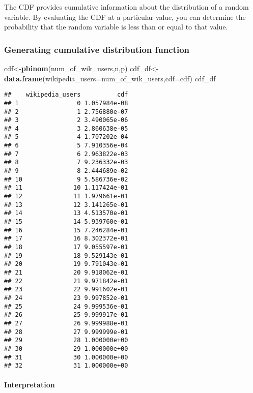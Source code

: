 \documentclass[
]{article}
\newenvironment{Shaded}{\begin{snugshade}}{\end{snugshade}}
\newcommand{\AttributeTok}[1]{\textcolor[rgb]{0.13,0.29,0.53}{#1}}
\newcommand{\FunctionTok}[1]{\textcolor[rgb]{0.13,0.29,0.53}{\textbf{#1}}}
\newcommand{\NormalTok}[1]{#1}
\newcommand{\OtherTok}[1]{\textcolor[rgb]{0.56,0.35,0.01}{#1}}
\begin{document}
The CDF provides cumulative information about the distribution of a
random variable. By evaluating the CDF at a particular value, you can
determine the probability that the random variable is less than or equal
to that value.

\subsubsection{Generating cumulative distribution
function}\label{generating-cumulative-distribution-function}

\begin{Shaded}
\begin{Highlighting}[]
\NormalTok{cdf}\OtherTok{\textless{}{-}}\FunctionTok{pbinom}\NormalTok{(num\_of\_wik\_users,n,p)}
\NormalTok{cdf\_df}\OtherTok{\textless{}{-}}\FunctionTok{data.frame}\NormalTok{(}\AttributeTok{wikipedia\_users=}\NormalTok{num\_of\_wik\_users,}\AttributeTok{cdf=}\NormalTok{cdf)}
\NormalTok{cdf\_df}
\end{Highlighting}
\end{Shaded}

\begin{verbatim}
##    wikipedia_users          cdf
## 1                0 1.057984e-08
## 2                1 2.756880e-07
## 3                2 3.490065e-06
## 4                3 2.860638e-05
## 5                4 1.707202e-04
## 6                5 7.910356e-04
## 7                6 2.963822e-03
## 8                7 9.236332e-03
## 9                8 2.444689e-02
## 10               9 5.586736e-02
## 11              10 1.117424e-01
## 12              11 1.979661e-01
## 13              12 3.141265e-01
## 14              13 4.513570e-01
## 15              14 5.939760e-01
## 16              15 7.246284e-01
## 17              16 8.302372e-01
## 18              17 9.055597e-01
## 19              18 9.529143e-01
## 20              19 9.791043e-01
## 21              20 9.918062e-01
## 22              21 9.971842e-01
## 23              22 9.991602e-01
## 24              23 9.997852e-01
## 25              24 9.999536e-01
## 26              25 9.999917e-01
## 27              26 9.999988e-01
## 28              27 9.999999e-01
## 29              28 1.000000e+00
## 30              29 1.000000e+00
## 31              30 1.000000e+00
## 32              31 1.000000e+00
\end{verbatim}

\paragraph{Interpretation}\label{interpretation-2}
\end{document}
